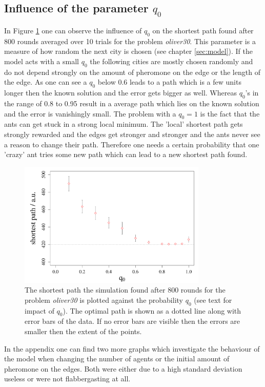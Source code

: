 \subsection{Influence of the parameter $q_0$}

In Figure \ref{fig:q0zushortestpath} one can observe the influence of $q_0$ on the shortest path found after 800 rounds averaged over 10 trials for the problem \textit{oliver30}. This parameter is a measure of how random the next city is chosen (see chapter \ref{sec:model}). If the model acts with a small $q_0$ the following cities are mostly chosen randomly and do not depend strongly on the amount of pheromone on the edge or the length of the edge. As one can see a $q_0$ below 0.6 leads to a path which is a few units longer then the known solution and the error gets bigger as well. Whereas $q_0$'s in the range of 0.8 to 0.95 result in a average path which lies on the known solution and the error is vanishingly small. The problem with a $q_0 = 1$ is the fact that the ants can get stuck in a strong local minimum. The 'local' shortest path gets strongly rewarded and the edges get stronger and stronger and the ants never see a reason to change their path. Therefore one needs a certain probability that one 'crazy' ant tries some new path which can lead to a new shortest path found.\\
\newline

\begin{figure}[H]

	\centering
	\includegraphics[width=0.8\textwidth]{Plots/q0_vs_shortestpath.pdf}

\caption{The shortest path the simulation found after 800 rounds for the problem \textit{oliver30} is plotted against the probability $q_0$ (see text for impact of $q_0$). The optimal path is shown as a dotted line along with error bars of the data. If no error bars are visible then the errors are smaller then the extent of the points.}
\label{fig:q0zushortestpath}
\end{figure}

\noindent In the appendix one can find two more graphs which investigate the behaviour of the model when changing the number of agents or the initial amount of pheromone on the edges. Both were either due to a high standard deviation useless or were not flabbergasting at all.

